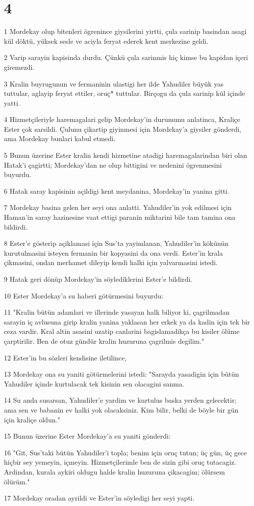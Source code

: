 \chapter{4}

\par 1 Mordekay olup bitenleri ögrenince giysilerini yirtti, çula sarinip basindan asagi kül döktü, yüksek sesle ve aciyla feryat ederek kent merkezine geldi.
\par 2 Varip sarayin kapisinda durdu. Çünkü çula sarinmis hiç kimse bu kapidan içeri giremezdi.
\par 3 Kralin buyrugunun ve fermaninin ulastigi her ilde Yahudiler büyük yas tuttular, aglayip feryat ettiler, oruç* tuttular. Birçogu da çula sarinip kül içinde yatti.
\par 4 Hizmetçileriyle haremagalari gelip Mordekay'in durumunu anlatinca, Kraliçe Ester çok sarsildi. Çulunu çikartip giyinmesi için Mordekay'a giysiler gönderdi, ama Mordekay bunlari kabul etmedi.
\par 5 Bunun üzerine Ester kralin kendi hizmetine atadigi haremagalarindan biri olan Hatak'i çagirtti; Mordekay'dan ne olup bittigini ve nedenini ögrenmesini buyurdu.
\par 6 Hatak saray kapisinin açildigi kent meydanina, Mordekay'in yanina gitti.
\par 7 Mordekay basina gelen her seyi ona anlatti. Yahudiler'in yok edilmesi için Haman'in saray hazinesine vaat ettigi paranin miktarini bile tam tamina ona bildirdi.
\par 8 Ester'e gösterip açiklamasi için Sus'ta yayimlanan, Yahudiler'in kökünün kurutulmasini isteyen fermanin bir kopyasini da ona verdi. Ester'in krala çikmasini, ondan merhamet dileyip kendi halki için yalvarmasini istedi.
\par 9 Hatak geri dönüp Mordekay'in söylediklerini Ester'e bildirdi.
\par 10 Ester Mordekay'a su haberi götürmesini buyurdu:
\par 11 "Kralin bütün adamlari ve illerinde yasayan halk biliyor ki, çagrilmadan sarayin iç avlusuna girip kralin yanina yaklasan her erkek ya da kadin için tek bir ceza vardir. Kral altin asasini uzatip canlarini bagislamadikça bu kisiler ölüme çarptirilir. Ben de otuz gündür kralin huzuruna çagrilmis degilim."
\par 12 Ester'in bu sözleri kendisine iletilince,
\par 13 Mordekay ona su yaniti götürmelerini istedi: "Sarayda yasadigin için bütün Yahudiler içinde kurtulacak tek kisinin sen olacagini sanma.
\par 14 Su anda susarsan, Yahudiler'e yardim ve kurtulus baska yerden gelecektir; ama sen ve babanin ev halki yok olacaksiniz. Kim bilir, belki de böyle bir gün için kraliçe oldun."
\par 15 Bunun üzerine Ester Mordekay'a su yaniti gönderdi:
\par 16 "Git, Sus'taki bütün Yahudiler'i topla; benim için oruç tutun; üç gün, üç gece hiçbir sey yemeyin, içmeyin. Hizmetçilerimle ben de sizin gibi oruç tutacagiz. Ardindan, kurala aykiri oldugu halde kralin huzuruna çikacagim; ölürsem ölürüm."
\par 17 Mordekay oradan ayrildi ve Ester'in söyledigi her seyi yapti.

